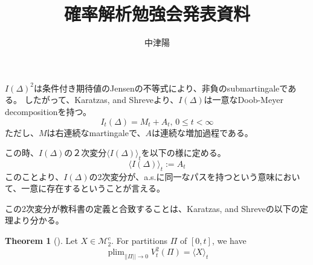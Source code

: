 \documentclass{ltjsarticle}
\theoremstyle{definition}
\newtheorem{thm}[dfn]{Theorem}
\DeclareMathOperator*{\plim}{plim}
\begin{document}
\title{確率解析勉強会発表資料}
\author{中津陽}
\maketitle

$I(\Delta)^2$は条件付き期待値のJensenの不等式により、非負のsubmartingaleである。
したがって、Karatzas, and Shreveより、$I(\Delta)$は一意なDoob-Meyer decompositionを持つ。
\begin{equation}
    I_t(\Delta) = M_t + A_t, \, 0 \leq t < \infty
\end{equation}
ただし、$M$は右連続なmartingaleで、$A$は連続な増加過程である。

この時、$I(\Delta)$の２次変分$\langle I(\Delta)\rangle_t$を以下の様に定める。
\begin{equation}
    \langle I(\Delta) \rangle_t := A_t
\end{equation}
このことより、$I(\Delta)$の2次変分が、a.s.に同一なパスを持つという意味において、一意に存在するということが言える。

この2次変分が教科書の定義と合致することは、Karatzas, and Shreveの以下の定理より分かる。
\begin{thm}[]
    Let $X \in \mathcal{M}_{2}^c$.
    For partitions $\Pi$ of $[0, t]$, we have
    \begin{equation}
        \plim_{||\Pi|| \to 0} V_{t}^{2} (\Pi) = \langle X \rangle_t
    \end{equation}
\end{thm}




\end{document}
